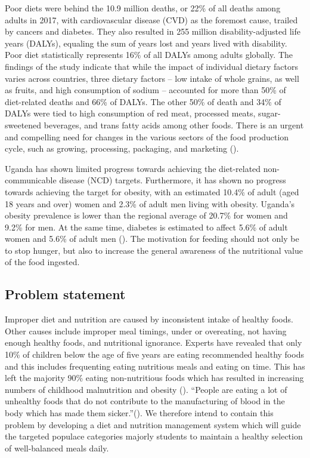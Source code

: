 \documentclass{article}
\begin{document}
Poor diets were behind the 10.9 million deaths, or 22\% of all deaths among adults in 2017, with cardiovascular disease (CVD) as the foremost cause, trailed by cancers and diabetes. They also resulted in 255 million disability-adjusted life years (DALYs), equaling the sum of years lost and years lived with disability. Poor diet statistically represents 16\% of all DALYs among adults globally. The findings of the study indicate that while the impact of individual dietary factors varies across countries, three dietary factors – low intake of whole grains, as well as fruits, and high consumption of sodium – accounted for more than 50\% of diet-related deaths and 66\% of DALYs. The other 50\% of death and 34\% of DALYs were tied to high consumption of red meat, processed meats, sugar-sweetened beverages, and trans fatty acids among other foods. There is an urgent and compelling need for changes in the various sectors of the food production cycle, such as growing, processing, packaging, and marketing (\cite{ihme2019new}).

Uganda has shown limited progress towards achieving the diet-related non-communicable disease (NCD) targets. Furthermore, it has shown no progress towards achieving the target for obesity, with an estimated 10.4\% of adult (aged 18 years and over) women and 2.3\% of adult men living with obesity. Uganda's obesity prevalence is lower than the regional average of 20.7\% for women and 9.2\% for men. At the same time, diabetes is estimated to affect 5.6\% of adult women and 5.6\% of adult men (\cite{globalnutritionreportn.d.}). The motivation for feeding should not only be to stop hunger, but also to increase the general awareness of the nutritional value of the food ingested.

\subsection{Problem statement}
Improper diet and nutrition are caused by inconsistent intake of healthy foods. Other causes include improper meal timings, under or overeating, not having enough healthy foods, and nutritional ignorance. Experts have revealed that only 10\% of children below the age of five years are eating recommended healthy foods and this includes frequenting eating nutritious meals and eating on time. This has left the majority 90\% eating non-nutritious foods which has resulted in increasing numbers of childhood malnutrition and obesity (\cite{tumwine2022only}). “People are eating a lot of unhealthy foods that do not contribute to the manufacturing of blood in the body which has made them sicker.”(\cite{tumwine2022only}). We therefore intend to contain this problem by developing a diet and nutrition management system which will guide the targeted populace categories majorly students to maintain a healthy selection of well-balanced meals daily.
\end{document}
